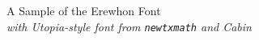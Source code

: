 \documentclass[11pt]{article}
\begin{document}
{\LARGE \noindent A Sample of the Erewhon Font}\\

{\large \noindent \textit{with Utopia-style font from \texttt{newtxmath} and Cabin}}\\[5pt]


\end{document}
